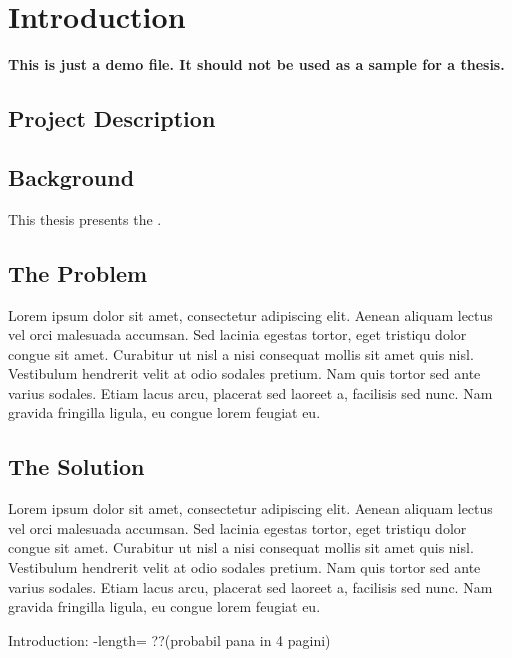 \chapter{Introduction}
\label{chapter:intro}

\textbf{This is just a demo file. It should not be used as a sample for a thesis.}\\

\section{Project Description}
\label{sec:proj}

\section{Background}
\label{sec:background}

This thesis presents the \textbf{\project}.


\section{The Problem}
\label{sec:the-problem}


Lorem ipsum dolor sit amet, consectetur adipiscing elit. Aenean aliquam lectus vel orci malesuada accumsan. Sed lacinia egestas tortor, eget tristiqu dolor congue sit amet. Curabitur ut nisl a nisi consequat mollis sit amet quis nisl. Vestibulum hendrerit velit at odio sodales pretium. Nam quis tortor sed ante varius sodales. Etiam lacus arcu, placerat sed laoreet a, facilisis sed nunc. Nam gravida fringilla ligula, eu congue lorem feugiat eu.

\section{The Solution}

Lorem ipsum dolor sit amet, consectetur adipiscing elit. Aenean aliquam lectus vel orci malesuada accumsan. Sed lacinia egestas tortor, eget tristiqu dolor congue sit amet. Curabitur ut nisl a nisi consequat mollis sit amet quis nisl. Vestibulum hendrerit velit at odio sodales pretium. Nam quis tortor sed ante varius sodales. Etiam lacus arcu, placerat sed laoreet a, facilisis sed nunc. Nam gravida fringilla ligula, eu congue lorem feugiat eu.



Introduction:
-length= ??(probabil pana in 4 pagini)    

